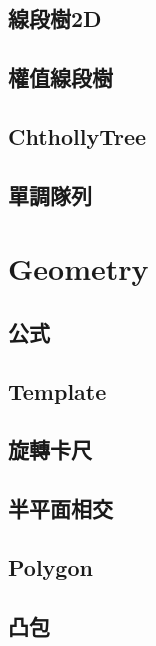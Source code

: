     \subsection{線段樹2D}
         \columnbreak
    \subsection{權值線段樹}
         \columnbreak
    \subsection{ChthollyTree}
         
    \subsection{單調隊列}
        
\clearpage
        
\section{Geometry}
    \subsection{公式}
        
    \subsection{Template}
        
    \subsection{旋轉卡尺}
        
    \subsection{半平面相交}
        
    \subsection{Polygon}
         \columnbreak
        \subsection{凸包}
        
